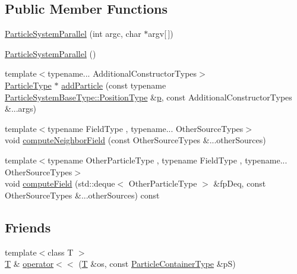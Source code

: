 \subsection*{Public Member Functions}
\begin{DoxyCompactItemize}
\item 
\hyperlink{classmodel_1_1_particle_system_parallel_a01f334207985e0b26f670aa1d6a541b5}{Particle\+System\+Parallel} (int argc, char $\ast$argv\mbox{[}$\,$\mbox{]})
\item 
\hyperlink{classmodel_1_1_particle_system_parallel_a38f026fa74a7399cf37348d74d0b7b00}{Particle\+System\+Parallel} ()
\item 
{\footnotesize template$<$typename... Additional\+Constructor\+Types$>$ }\\\hyperlink{classmodel_1_1_particle_system_base_a3a4f5423639021d769ab7d4cfbf246c3}{Particle\+Type} $\ast$ \hyperlink{classmodel_1_1_particle_system_parallel_a5c89e91e83198a41ed7f93b1b940cf22}{add\+Particle} (const typename \hyperlink{classmodel_1_1_particle_system_base_ab0a407d587b9779443f0b45e55185002}{Particle\+System\+Base\+Type\+::\+Position\+Type} \&\hyperlink{plot_cells_8m_ac483f6ce851c9ecd9fb835ff7551737c}{p}, const Additional\+Constructor\+Types \&...args)
\item 
{\footnotesize template$<$typename Field\+Type , typename... Other\+Source\+Types$>$ }\\void \hyperlink{classmodel_1_1_particle_system_parallel_ab041d0a98e6f4027975108f7b4e6ed81}{compute\+Neighbor\+Field} (const Other\+Source\+Types \&...other\+Sources)
\item 
{\footnotesize template$<$typename Other\+Particle\+Type , typename Field\+Type , typename... Other\+Source\+Types$>$ }\\void \hyperlink{classmodel_1_1_particle_system_parallel_a58087b039945fc21f469d18db03f22cf}{compute\+Field} (std\+::deque$<$ Other\+Particle\+Type $>$ \&fp\+Deq, const Other\+Source\+Types \&...other\+Sources) const 
\end{DoxyCompactItemize}
\subsection*{Friends}
\begin{DoxyCompactItemize}
\item 
{\footnotesize template$<$class T $>$ }\\\hyperlink{_spline_node_base__corder1_8h_a82692d3a5502b91460591f1d5504314a}{T} \& \hyperlink{classmodel_1_1_particle_system_parallel_ab12e91f48bb9a19e54a866d70c9ff9db}{operator$<$$<$} (\hyperlink{_spline_node_base__corder1_8h_a82692d3a5502b91460591f1d5504314a}{T} \&os, const \hyperlink{classmodel_1_1_particle_system_base_ac95d9a819d1da5e86f726494bf6df504}{Particle\+Container\+Type} \&p\+S)
\end{DoxyCompactItemize}
